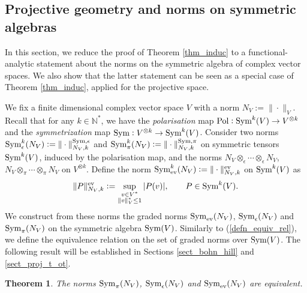 \documentclass[12pt]{article}
\numberwithin{equation}{section}
\theoremstyle{theorem}
\newtheorem{thm}{Theorem}[section]
\theoremstyle{definition}
\theoremstyle{remark}
\newcommand{\sym}{{\rm{Sym}}}
\newcommand{\nat}{\mathbb{N}}
\begin{document}
	
	\subsection{Projective geometry and norms on symmetric algebras}\label{sect_norm_proj}
	In this section, we reduce the proof of Theorem \ref{thm_induc} to a functional-analytic statement about the norms on the symmetric algebra of complex vector spaces. 
	We also show that the latter statement can be seen as a special case of Theorem \ref{thm_induc}, applied for the projective space.
	\par 
	\begin{sloppypar}
	We fix a finite dimensional complex vector space $V$ with a norm $N_V := \| \cdot \|_V$.
	Recall that for any $k \in \nat^*$, we have the \textit{polarisation} map ${\rm{Pol}} : \sym^k(V) \to V^{\otimes k}$ and the \textit{symmetrization} map $\sym : V^{\otimes k} \to \sym^k(V)$.
	Consider two norms $\sym^k_{\epsilon}(N_V) := \| \cdot \|^{\sym, \epsilon}_{N_V, k}$ and $\sym^k_{\pi}(N_V) := \| \cdot \|^{\sym, \pi}_{N_V, k}$ on symmetric tensors $\sym^k(V)$, induced by the polarisation map, and the norms $N_V \otimes_{\epsilon} \cdots \otimes_{\epsilon} N_V$, $N_V \otimes_{\pi} \cdots \otimes_{\pi} N_V$ on $V^{\otimes k}$.
	Define the norm $\sym^k_{{\rm{ev}}}(N_V) := \| \cdot \|^{{\rm{ev}}}_{N_V, k}$ on $\sym^k(V)$ as
	\begin{equation}\label{eq_sup_norm_polll}
		\| P \|^{{\rm{ev}}}_{N_V, k}
		:=
		\sup_{\substack{v \in V^* \\ \| v \|_V^* \leq 1}} |P(v)|, 
		\qquad
		P \in \sym^k(V).
	\end{equation}
	We construct from these norms the graded norms $\sym_{{\rm{ev}}}(N_V)$, $\sym_{\epsilon}(N_V)$ and $\sym_{\pi}(N_V)$ on the symmetric algebra $\sym(V)$.
	Similarly to (\ref{defn_equiv_rel}), we define the equivalence relation on the set of graded norms over $\sym(V)$.
	The following result will be established in Sections \ref{sect_bohn_hill} and \ref{sect_proj_t_ot}.
	\end{sloppypar}
	\begin{thm}\label{thm_sym_equiv}
		The norms $\sym_{\pi}(N_V)$, $\sym_{\epsilon}(N_V)$ and $\sym_{{\rm{ev}}}(N_V)$ are equivalent.
	\end{thm}
\end{document}

